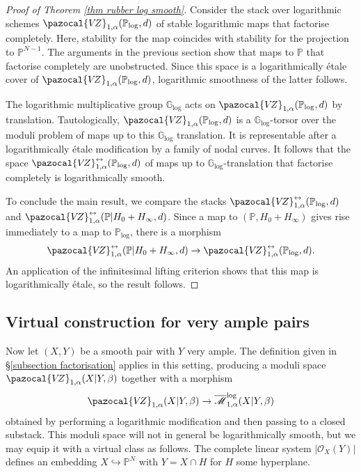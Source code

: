 \documentclass[11pt]{amsart}
\newcommand{\PP}{\mathbb P}
\newcommand{\VZ}{\pazocal{V\!Z}}
\newcommand{\OO}{\mathcal{O}}
\renewcommand{\to}{\rightarrow}
\newcommand{\Glog}{\mathbb{G}_{\mathrm{log}}}
\newcommand{\Mcal}{\mathcal{M}}
\newcommand{\ol}[1]{\overline{#1}}
\theoremstyle{definition}
\theoremstyle{definition}
\begin{document}
\begin{proof}[Proof of Theorem \ref{thm rubber log smooth}]
Consider the stack over logarithmic schemes $\VZ_{1,\alpha}(\mathbb P_{\mathrm{log}},d)$ of stable logarithmic maps that factorise completely. Here, stability for the map coincides with stability for the projection to $\mathbb P^{N-1}$. The arguments in the previous section show that maps to $\mathbb P$ that factorise completely are unobstructed. Since this space is a logarithmically \'etale cover of $\VZ_{1,\alpha}(\mathbb P_{\mathrm{log}},d)$, logarithmic smoothness of the latter follows.

The logarithmic multiplicative group $\mathbb G_{\mathrm{log}}$ acts on $\VZ_{1,\alpha}(\mathbb P_{\mathrm{log}},d)$ by translation. Tautologically, $\VZ_{1,\alpha}(\mathbb P_{\mathrm{log}},d)$ is a $\mathbb G_{\mathrm{log}}$-torsor over the moduli problem of maps up to this $\mathbb G_{\mathrm{log}}$ translation. It is representable after a logarithmically \'etale modification by a family of nodal curves. It follows that the space $\VZ^{\leftrightarrow}_{1,\alpha}(\mathbb P_{\mathrm{log}},d)$ of maps up to $\Glog$-translation that factorise completely is logarithmically smooth. 

To conclude the main result, we compare the stacks $\VZ^{\leftrightarrow}_{1,\alpha}(\mathbb P_{\mathrm{log}},d)$ and  $\VZ^{\leftrightarrow}_{1,\alpha}(\mathbb P|H_0+H_\infty,d)$. Since a map to $(\mathbb P,H_0+H_\infty)$ gives rise immediately to a map to $\mathbb P_{\mathrm{log}}$, there is a morphism
\[
\VZ^{\leftrightarrow}_{1,\alpha}(\mathbb P|H_0+H_\infty,d)\to \VZ^{\leftrightarrow}_{1,\alpha}(\mathbb P_{\mathrm{log}},d).
\]
An application of the infinitesimal lifting criterion shows that this map is logarithmically \'etale, so the result follows.
\end{proof}

\subsection{Virtual construction for very ample pairs}\label{subsection virtual}
Now let $(X,Y)$ be a smooth pair with $Y$ very ample. The definition given in \S \ref{subsection factorisation} applies in this setting, producing a moduli space $\VZ_{1,\alpha}(X|Y,\beta)$ together with a morphism
\begin{equation*} \VZ_{1,\alpha}(X|Y,\beta) \to \ol\Mcal^{\operatorname{log}}_{1,\alpha}(X|Y,\beta)\end{equation*}
obtained by performing a logarithmic modification and then passing to a closed substack. This moduli space will not in general be logarithmically smooth, but we may equip it with a virtual class as follows. The complete linear system $|\OO_X(Y)|$ defines an embedding $X \hookrightarrow \PP^N$ with $Y=X\cap H$ for $H$ some hyperplane.
\end{document}
